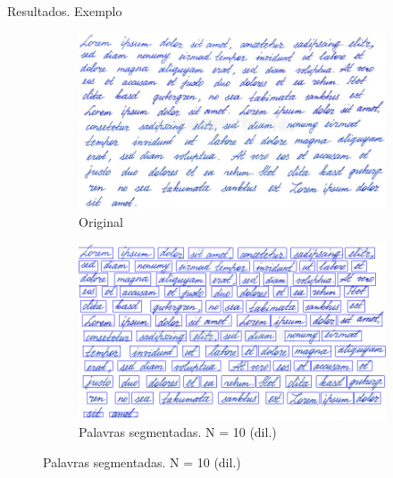 \documentclass{beamer}
\begin{document}
\begin{frame}[allowframebreaks]{Resultados. Exemplo}

\begin{figure}
    \centering
    \begin{subfigure}[]{0.49\textwidth}
        \centering
        \includegraphics[width=\textwidth]{images/handwrite.png}
        \caption{Original}
    \end{subfigure}
    \begin{subfigure}[]{0.49\textwidth}
        \centering
        \includegraphics[width=\textwidth]{images/handwrite_words_10_01.png}
        \caption{Palavras segmentadas. N = 10 (dil.)}
    \end{subfigure}
\end{figure}

\framebreak


\end{frame}
\end{document}
